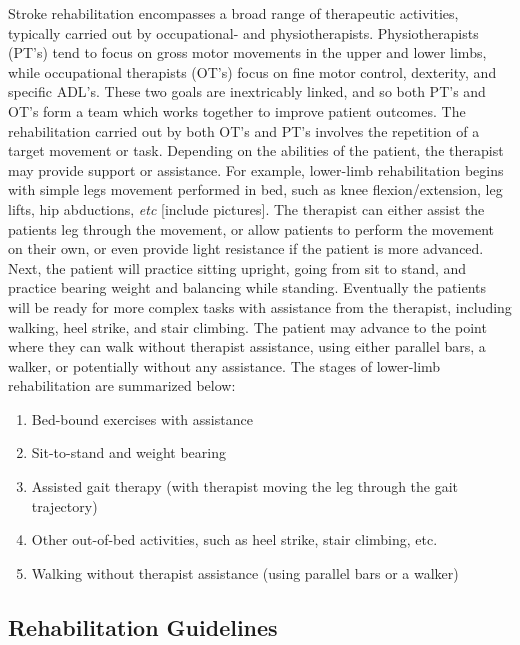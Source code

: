 \documentclass[12pt]{report}
\begin{document}
Stroke rehabilitation encompasses a broad range of therapeutic activities, typically carried out by occupational- and physiotherapists. Physiotherapists (PT's) tend to focus on gross motor movements in the upper and lower limbs, while occupational therapists (OT's) focus on fine motor control, dexterity, and specific ADL's. These two goals are inextricably linked, and so both PT's and OT's form a team which works together to improve patient outcomes. The rehabilitation carried out by both OT's and PT's involves the repetition of a target movement or task. Depending on the abilities of the patient, the therapist may provide support or assistance. For example, lower-limb rehabilitation begins with simple legs movement performed in bed, such as knee flexion/extension, leg lifts, hip abductions, \textit{etc} [include pictures]. The therapist can either assist the patients leg through the movement, or allow patients to perform the movement on their own, or even provide light resistance if the patient is more advanced. Next, the patient will practice sitting upright, going from sit to stand, and  practice bearing weight and balancing while standing. Eventually the patients will be ready for more complex tasks with assistance from the therapist, including walking, heel strike, and stair climbing. The patient may advance to the point where they can walk without therapist assistance, using either parallel bars, a walker, or potentially without any assistance. The stages of lower-limb rehabilitation are summarized below:

\begin{enumerate}
	\item Bed-bound exercises with assistance
	\item Sit-to-stand and weight bearing
	\item Assisted gait therapy (with therapist moving the leg through the gait trajectory)
	\item Other out-of-bed activities, such as heel strike, stair climbing, etc.
	\item Walking without therapist assistance (using parallel bars or a walker)
\end{enumerate}



\subsection{Rehabilitation Guidelines}
\end{document}
